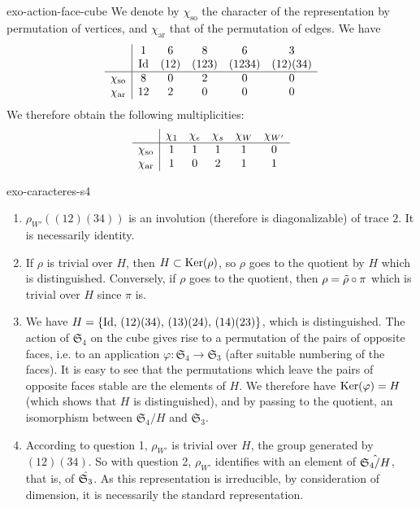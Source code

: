  
\begin{correction}{exo-action-face-cube}
We denote by $ \chi_{\text{so}} $ the character of the representation by permutation of vertices, and $ \chi_{\text{ar}} $ that of the permutation of edges. We have
\begin{equation*}
\begin{array}{c | ccccc} & 1 & 6 & 8 & 6 & 3 \\& \operatorname{Id} & (12) & (123) & (1234) & (12) (34) \\\hline \chi_{\text{so}} & 8 & 0 & 2 & 0 & 0 \\\chi_{\text{ar}} & 12 & 2 & 0 & 0 & 0 \end{array}
\end{equation*}
We therefore obtain the following multiplicities:
\begin{equation*}
\begin{array}{c | ccccc} & \chi_1 & \chi_\epsilon & \chi_s & \chi_{W} & \chi_{W'} \\\hline \chi_{\text{so}} & 1 & 1 & 1 & 1 & 0 \\\chi_{\text{ar}} & 1 & 0 & 2 & 1 & 1 \end{array}
\end{equation*}
\end{correction}
 
 
\begin{correction}{exo-caracteres-s4}
\begin{enumerate}
\item {}  $ \rho_{W'} ((12) (34)) $ is an involution (therefore is diagonalizable) of trace $ 2 $. It is necessarily identity.
\item {} If $ \rho $ is trivial over $ H $, then $ H \subset \operatorname{Ker} (\rho) $, so $ \rho $ goes to the quotient by $ H $ which is distinguished. Conversely, if $ \rho $ goes to the quotient, then $ \rho = \tilde{\rho} \circ \pi $ which is trivial over $ H $ since $ \pi $ is.
\item We have $ H = \{\operatorname{Id}, \, (12) (34), \, (13) (24), \, (14) (23)\} $, which is distinguished. The action of $ \mathfrak{S}_4 $ on the cube gives rise to a permutation of the pairs of opposite faces, i.e. to an application $ \varphi: \mathfrak{S}_4 \rightarrow \mathfrak{S}_3 $ (after suitable numbering of the faces). It is easy to see that the permutations which leave the pairs of opposite faces stable are the elements of $ H $. We therefore have $ \operatorname{Ker} (\varphi) = H $ (which shows that $ H $ is distinguished), and by passing to the quotient, an isomorphism between $ \mathfrak{S}_4/H $ and $ \mathfrak{S}_3 $.
\item According to question 1, $ \rho_{W'} $ is trivial over $ H $, the group generated by $ (12) (34) $. So with question 2, $ \rho_{W'} $ identifies with an element of $ \hat{\mathfrak{S}_4/H} $, that is, of $ \hat{\mathfrak{S}_3} $. As this representation is irreducible, by consideration of dimension, it is necessarily the standard representation.
\end{enumerate}
\end{correction}
 
